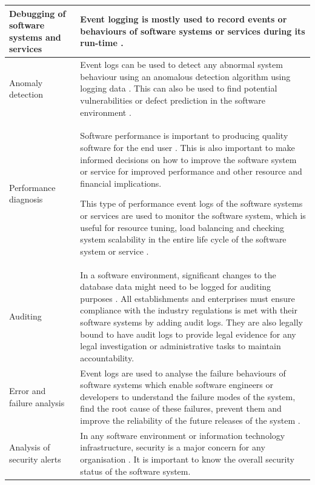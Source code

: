 \begin{xltabular}{\textwidth}{|l|X|}
		\hline Debugging of software systems and services & Event logging is mostly used to record events or behaviours of software systems or services during its run-time \cite{Rong2018a}.\\
		\hline Anomaly detection & Event logs can be used to detect any abnormal system behaviour using an anomalous detection algorithm using logging data \cite{Gurumdimma2016}. This can also be used to find potential vulnerabilities or defect prediction in the software environment \cite{Dwyer2013}. \\
		\hline Performance diagnosis & Software performance is important to producing quality software for the end user \cite{EvangelinGeetha2007, Baccanico2014}. This is also important to make informed decisions on how to improve the software system or service for improved performance and other resource and financial implications.\par This type of performance event logs of the software systems or services are used to monitor the software system, which is useful for resource tuning, load balancing and checking system scalability in the entire life cycle of the software system or service \cite{Song2017}. \\ 
		\hline Auditing & In a software environment, significant changes to the database data might need to be logged for auditing purposes \cite{Rong2018a}. All establishments and enterprises must ensure compliance with the industry regulations is met with their software systems by adding audit logs. They are also legally bound to have audit logs to provide legal evidence for any legal investigation or administrative tasks to maintain accountability. \\
		\hline Error and failure analysis & Event logs are used to analyse the failure behaviours of software systems which enable software engineers or developers to understand the failure modes of the system, find the root cause of these failures, prevent them and improve the reliability of the future releases of the system \cite{Cinque2013}.\\
		\hline Analysis of security alerts & In any software environment or information technology infrastructure, security is a major concern for any organisation \cite{Pathan2014, Dwyer2013}. It is important to know the overall security status of the software system. \\
\end{xltabular}

